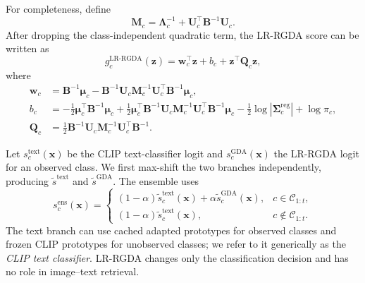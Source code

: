 For completeness, define
\begin{equation}
    \mathbf{M}_c
    =\boldsymbol{\Lambda}_c^{-1}
    +\mathbf{U}_c^\top\mathbf{B}^{-1}\mathbf{U}_c.
\end{equation}
After dropping the class-independent quadratic term, the LR-RGDA score can be written as
\begin{equation}
    g_c^{\mathrm{LR\text{-}RGDA}}(\mathbf{z})
    =\mathbf{w}_c^\top\mathbf{z}+b_c+\mathbf{z}^\top\mathbf{Q}_c\mathbf{z},
    \label{eq:lr_rgda}
\end{equation}
where
\begin{align}
    \mathbf{w}_c
    &=\mathbf{B}^{-1}\boldsymbol{\mu}_c
      -\mathbf{B}^{-1}\mathbf{U}_c\mathbf{M}_c^{-1}
       \mathbf{U}_c^\top\mathbf{B}^{-1}\boldsymbol{\mu}_c,
       \label{eq:wc}\\
    b_c
    &=-\frac{1}{2}\boldsymbol{\mu}_c^\top\mathbf{B}^{-1}\boldsymbol{\mu}_c
      +\frac{1}{2}\boldsymbol{\mu}_c^\top\mathbf{B}^{-1}\mathbf{U}_c
       \mathbf{M}_c^{-1}\mathbf{U}_c^\top\mathbf{B}^{-1}\boldsymbol{\mu}_c
      -\frac{1}{2}\log|\mathbf{\Sigma}_c^{\mathrm{reg}}|+\log\pi_c,
      \label{eq:bc}\\
    \mathbf{Q}_c
    &=\frac{1}{2}\mathbf{B}^{-1}\mathbf{U}_c\mathbf{M}_c^{-1}
      \mathbf{U}_c^\top\mathbf{B}^{-1}.
      \label{eq:qc}
\end{align}

Let $s_c^{\mathrm{text}}(\mathbf{x})$ be the CLIP text-classifier logit and $s_c^{\mathrm{GDA}}(\mathbf{x})$ the LR-RGDA logit for an observed class. We first max-shift the two branches independently, producing $\widetilde{s}^{\mathrm{text}}$ and $\widetilde{s}^{\mathrm{GDA}}$. The ensemble uses
\begin{equation}
    s_c^{\mathrm{ens}}(\mathbf{x})=
    \begin{cases}
      (1-\alpha)\widetilde{s}_c^{\mathrm{text}}(\mathbf{x})
      +\alpha\widetilde{s}_c^{\mathrm{GDA}}(\mathbf{x}),
      & c\in\mathcal{C}_{1:t},\\
      (1-\alpha)\widetilde{s}_c^{\mathrm{text}}(\mathbf{x}),
      & c\notin\mathcal{C}_{1:t}.
    \end{cases}
    \label{eq:ensemble}
\end{equation}
The text branch can use cached adapted prototypes for observed classes and frozen CLIP prototypes for unobserved classes; we refer to it generically as the \emph{CLIP text classifier}. LR-RGDA changes only the classification decision and has no role in image--text retrieval.
